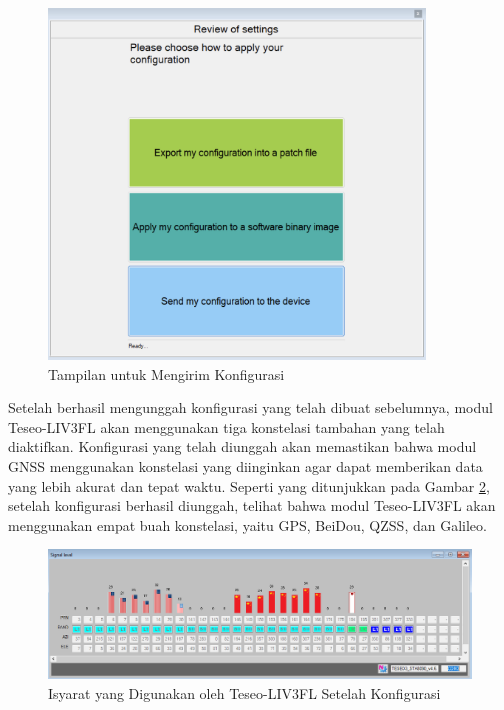 \begin{figure}[H]
	\centering
	\includegraphics[width=10cm]{contents/chapter-3/setting-konstelasi/kirim-konfigurasi.png}
	\caption{Tampilan untuk Mengirim Konfigurasi}
	\label{Fig: kirim-konstelasi}
\end{figure}

Setelah berhasil mengunggah konfigurasi yang telah dibuat sebelumnya, modul Teseo-LIV3FL akan menggunakan tiga konstelasi tambahan yang telah diaktifkan. Konfigurasi yang telah diunggah akan memastikan bahwa modul GNSS menggunakan konstelasi yang diinginkan agar dapat memberikan data yang lebih akurat dan tepat waktu. Seperti yang ditunjukkan pada Gambar \ref{Fig: setelah-konfigurasi}, setelah konfigurasi berhasil diunggah, telihat bahwa modul Teseo-LIV3FL akan menggunakan empat buah konstelasi, yaitu GPS, BeiDou, QZSS, dan Galileo. 

\begin{figure}[H]
	\centering
	\includegraphics[width=14cm]{contents/chapter-3/setting-konstelasi/setelah-konfigurasi.png}
	\caption{Isyarat yang Digunakan oleh Teseo-LIV3FL Setelah Konfigurasi}
	\label{Fig: setelah-konfigurasi}
	\end{figure}

